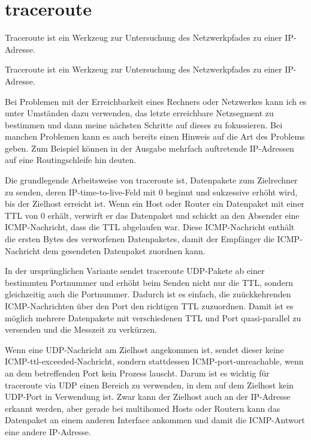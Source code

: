 \section{traceroute}
\label{sec:netz-werkzeuge-traceroute}
\begin{abstractsec}
  Traceroute ist ein Werkzeug zur Untersuchung des Netzwerkpfades zu einer
  IP-Adresse.
\end{abstractsec}
\begin{normaltext}
  Traceroute ist ein Werkzeug zur Untersuchung des Netzwerkpfades zu einer
  IP-Adresse.

  Bei Problemen mit der Erreichbarkeit eines Rechners oder Netzwerkes kann ich
  es unter Umständen dazu verwenden, das letzte erreichbare Netzsegment zu
  bestimmen und dann meine nächsten Schritte auf dieses zu fokussieren. Bei
  manchen Problemen kann es auch bereits einen Hinweis auf die Art des
  Problems geben. Zum Beispiel können in der Ausgabe mehrfach auftretende
  IP-Adressen auf eine Routingschleife hin deuten.

  Die grundlegende Arbeitsweise von traceroute ist, Datenpakete zum
  Zielrechner zu senden, deren IP-time-to-live-Feld mit 0 beginnt und
  sukzessive erhöht wird, bis der Zielhost erreicht ist. Wenn ein Host oder
  Router ein Datenpaket mit einer TTL von 0 erhält, verwirft er das Datenpaket
  und schickt an den Absender eine ICMP-Nachricht, dass die TTL abgelaufen
  war. Diese ICMP-Nachricht enthält die ersten Bytes des verworfenen
  Datenpaketes, damit der Empfänger die ICMP-Nachricht dem gesendeten
  Datenpaket zuordnen kann.

  In der ursprünglichen Variante sendet traceroute UDP-Pakete ab einer
  bestimmten Portnummer und erhöht beim Senden nicht nur die TTL, sondern
  gleichzeitig auch die Portnummer. Dadurch ist es einfach, die zuückkehrenden
  ICMP-Nachrichten über den Port den richtigen TTL zuzuordnen. Damit ist es
  möglich mehrere Datenpakete mit verschiedenen TTL und Port quasi-parallel zu
  versenden und die Messzeit zu verkürzen.

  Wenn eine UDP-Nachricht am Zielhost angekommen ist, sendet dieser keine
  ICMP-ttl-exceeded-Nachricht, sondern stattdessen ICMP-port-unreachable, wenn
  an dem betreffenden Port kein Prozess lauscht. Darum ist es wichtig für
  traceroute via UDP einen Bereich zu verwenden, in dem auf dem Zielhost kein
  UDP-Port in Verwendung ist. Zwar kann der Zielhost auch an der IP-Adresse
  erkannt werden, aber gerade bei multihomed Hosts oder Routern kann das
  Datenpaket an einem anderen Interface ankommen und damit die ICMP-Antwort
  eine andere IP-Adresse.


\end{normaltext}
